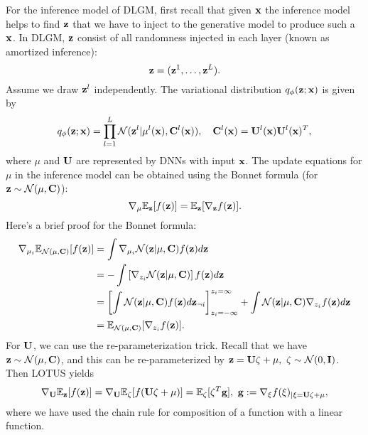 \documentclass[../book-template.tex]{subfiles}
\begin{document}
\par For the inference model of DLGM, first recall that given ${\bf x}$ the inference model helps to find ${\bf z}$ that we have to inject to the generative model to produce such a ${\bf x}$. In DLGM, ${\bf z}$ consist of all randomness injected in each layer (known as amortized inference):
\begin{equation*}
	{\bf z} =({\bf z}^1,\dots,{\bf z}^L).
\end{equation*}
Assume we draw ${\bf z}^l$ independently. The variational distribution $q_\phi({\bf z};{\bf x})$ is given by
\begin{equation*}
	q_\phi({\bf z};{\bf x})=\prod_{l=1}^{L}\mathcal{N}({\bf z}^l|\mu^l({\bf x}),{\bf C}^l({\bf x})),\quad {\bf C}^l({\bf x})={\bf U}^l({\bf x}){\bf U}^l({\bf x})^T,
\end{equation*}
where $\mu$ and $\bf U$ are represented by DNNs with input $\bf x$. The update equations for $\mu$ in the inference model can be obtained using the Bonnet formula (for ${\bf z}\sim \mathcal{N}(\mu,{\bf C})$):
\begin{equation*}
	\nabla_\mu\mathbb{E}_{\bf z}[f({\bf z})]=\mathbb{E}_{\bf z}[\nabla_{\bf z} f({\bf z})].
\end{equation*}
Here's a brief proof for the Bonnet formula:
\begin{align*}
	\nabla_{\mu_i}\mathbb{E}_{\mathcal{N}(\mu,{\bf C})}[f({\bf z})] &= \int  \nabla_{\mu_i} \mathcal{N}({\bf z}|\mu,{\bf C}) f({\bf z}) d{\bf z}\\
	&=-\int \left[\nabla_{z_i}\mathcal{N}({\bf z}|\mu,{\bf C})\right] f({\bf z}) d{\bf z}\\
	&=\left[\int\mathcal{N}({\bf z}|\mu,{\bf C}) f({\bf z}) d{\bf z}_{\neg i} \right]_{z_i=-\infty}^{z_i=\infty}+ \int \mathcal{N}({\bf z}|\mu,{\bf C}) \nabla_{z_i} f({\bf z}) d{\bf z}\\
	&=\mathbb{E}_{\mathcal{N}(\mu,{\bf C})}[\nabla_{z_i}f({\bf z})].
\end{align*}
For ${\bf U}$, we can use the re-parameterization trick. Recall that we have ${\bf z}\sim \mathcal{N}(\mu,{\bf C})$, and this can be re-parameterized by ${\bf z}={\bf U}\zeta +\mu,\ \zeta\sim\mathcal{N}(0,{\bf I})$. Then LOTUS yields
\begin{equation*}
	\nabla_{\bf U}\mathbb{E}_{\bf z}[f({\bf z})]=\nabla_{\bf U}\mathbb{E}_\zeta[f({\bf U}\zeta +\mu)]=\mathbb{E}_\zeta[\zeta^T{\bf g}],\ {\bf g}:=\nabla_\xi f(\xi)_{|\xi={\bf U}\zeta+\mu},
\end{equation*}
where we have used the chain rule for composition of a function with a linear function.
\end{document}
